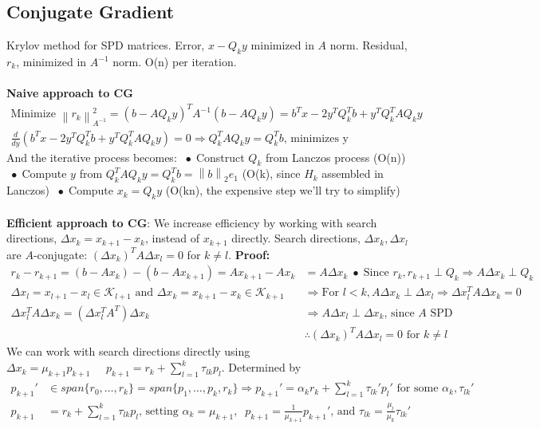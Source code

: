 \documentclass{article}
\newcommand{\norm}[2]{\left\lVert#1\right\rVert_#2}
\newcommand*\bspace{$\; \bullet \;$}
\begin{document}
\subsection{Conjugate Gradient}
Krylov method for SPD matrices. Error, $x - Q_ky$ minimized in $A$ norm. Residual, $r_k$, minimized in $A^{-1}$ norm. O(n) per iteration.\\\\
\textbf{Naive approach to CG}
\begin{align*}
    \textrm{Minimize } \norm{r_k}{{A^{-1}}}^2 = (b - AQ_ky)^TA^{-1}(b - AQ_ky) = b^Tx - 2y^TQ_k^Tb + y^TQ_k^TAQ_ky\\
    \frac{d}{dy}\left(b^Tx - 2y^TQ_k^Tb + y^TQ_k^TAQ_ky\right) = 0 \Longrightarrow Q^T_kAQ_ky = Q^T_kb \textrm{, minimizes y}
\end{align*}
And the iterative process becomes: \bspace Construct $Q_k$ from Lanczos process (O(n)) \bspace Compute $y$ from $Q^T_kAQ_ky = Q^T_kb = \norm{b}{2}e_1$ (O(k), since $H_k$ assembled in Lanczos) \bspace Compute $x_k = Q_ky$ (O(kn), the expensive step we'll try to simplify)\\\\
\textbf{Efficient approach to CG}: We increase efficiency by working with search directions, $\Delta x_k = x_{k+1} - x_k$, instead of $x_{k+1}$ directly. Search directions, $\Delta x_k, \Delta x_l$ are $A$-conjugate: $(\Delta x_k)^TA\Delta x_l = 0$ for $k \neq l$. \textbf{Proof:}
\begin{align*}
    r_k - r_{k+1} = (b - Ax_k) - (b - Ax_{k+1}) = Ax_{k+1} - Ax_k &= A \Delta x_k \; \bullet \; \textrm{Since } r_k, r_{k+1} \perp Q_k \Longrightarrow A \Delta x_k \perp Q_k\\
    \Delta x_l = x_{l+1} - x_l \in \mathcal{K}_{l+1} \textrm{ and } \Delta x_k = x_{k+1} - x_k \in \mathcal{K}_{k+1} &\Longrightarrow \textrm{For } l < k, A\Delta x_k\perp \Delta x_l \Rightarrow \Delta x_l^TA\Delta x_k = 0\\
    \Delta x_l^TA\Delta x_k = (\Delta x_l^TA^T)\Delta x_k &\Longrightarrow A\Delta x_l\perp \Delta x_k \textrm{, since $A$ SPD}\\
    &\therefore (\Delta x_k)^TA\Delta x_l = 0 \textrm{ for } k \neq l
\end{align*}
We can work with search directions directly using $\Delta x_k = \mu_{k+1}p_{k+1} \;\;\;\;\; p_{k+1} = r_k + \sum_{l=1}^k\tau_{lk}p_l$. Determined by
\begin{align*}
    p_{k+1}' &\in span\{r_0, \dots, r_k\} = span\{p_1, \dots, p_k, r_k\} \Longrightarrow p_{k+1}' = \alpha_kr_k + \sum_{l=1}^k \tau_{lk}'p_l' \textrm{ for some } \alpha_k, \tau_{lk}'\\
    p_{k+1} &= r_k + \sum_{l=1}^k \tau_{lk}p_l \textrm{, setting } \alpha_k = \mu_{k+1}, \;\;  p_{k+1} = \frac{1}{\mu_{k+1}}p_{k+1}' \textrm{, and } \tau_{lk} = \frac{\mu_l}{\mu_k}\tau_{lk}'
\end{align*}
\end{document}
